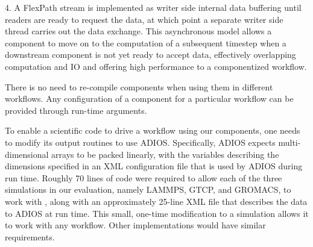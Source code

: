 4. A FlexPath stream is implemented as
writer side internal data buffering 
until readers are ready to request the data,
at which point a separate writer side thread carries out the data exchange.
This asynchronous model allows a 
\sys component to move on to the computation
of a subsequent timestep when a downstream
component is not yet ready to accept data,
effectively overlapping computation and IO
and offering high performance to a componentized workflow.

There is no need to re-compile \sys components when using them
in different workflows. Any configuration
of a component for a particular workflow
can be provided through run-time arguments.

To enable a scientific code to drive a workflow using our
\sys components, one needs to modify its output routines to use ADIOS.
Specifically, ADIOS expects multi-dimensional
arrays to be packed linearly, with the variables
describing the dimensions
specified in an XML configuration file
that is used by ADIOS during run time.
Roughly 70 lines of code were required
to allow each of the three simulations
in our evaluation, namely LAMMPS, GTCP, and GROMACS,
to work with \sys,
along with an approximately 25-line
XML file that describes the data to ADIOS
at run time.
This small, one-time modification to a simulation allows it to work with any
\sys workflow. Other implementations would have similar requirements.
